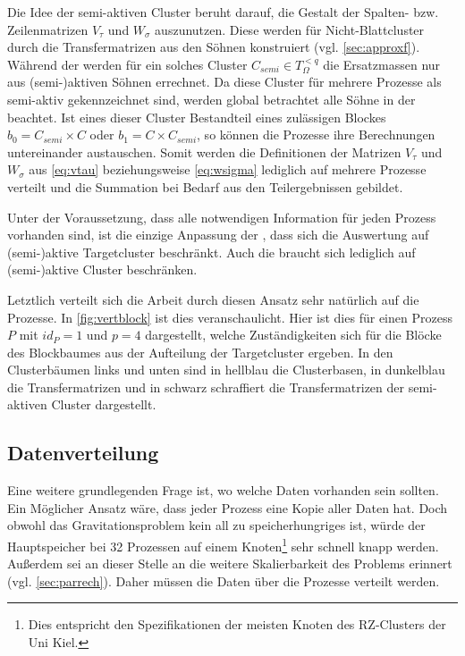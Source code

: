     Die Idee der semi-aktiven Cluster beruht darauf, die Gestalt der Spalten- bzw. Zeilenmatrizen $V_\tau$ und $W_\sigma$ auszunutzen. Diese werden für Nicht-Blattcluster durch die Transfermatrizen 
    aus den Söhnen konstruiert (vgl. \autoref{sec:approxf}). Während der \vorw werden für ein solches Cluster $C_{semi} \in T_\Omega^{<q}$ die Ersatzmassen nur aus (semi-)aktiven Söhnen
    errechnet. Da diese Cluster für mehrere Prozesse als semi-aktiv gekennzeichnet sind, werden global betrachtet alle Söhne in der \vorw beachtet. Ist eines dieser Cluster Bestandteil
    eines zulässigen Blockes $b_0 = C_{semi} \times C$ oder $b_1 = C \times C_{semi}$, so können die Prozesse ihre Berechnungen untereinander austauschen. Somit werden die Definitionen der Matrizen
    $V_\tau$ und $W_\sigma$ aus \autoref{eq:vtau} beziehungsweise \autoref{eq:wsigma} lediglich auf mehrere Prozesse verteilt und die Summation bei Bedarf aus den Teilergebnissen gebildet.
    
    Unter der Voraussetzung, dass alle notwendigen Information für jeden Prozess vorhanden sind, ist die einzige Anpassung der \koppl, dass sich die Auswertung auf (semi-)aktive
    Targetcluster beschränkt. Auch die \ruckw braucht sich lediglich auf (semi-)aktive Cluster beschränken.
    
    Letztlich verteilt sich die Arbeit durch diesen Ansatz sehr natürlich auf die Prozesse. In \autoref{fig:vertblock} ist dies veranschaulicht. Hier ist dies für einen Prozess $P$ mit $id_P = 1$ 
    und $p = 4$ dargestellt, welche Zuständigkeiten sich für die Blöcke des Blockbaumes aus der Aufteilung der Targetcluster ergeben. In den Clusterbäumen links und unten sind in hellblau die 
    Clusterbasen, in dunkelblau die Transfermatrizen und in schwarz schraffiert die Transfermatrizen der semi-aktiven Cluster dargestellt.
  
  \subsection{Datenverteilung}
  \label{sec:data}
    
    Eine weitere grundlegenden Frage ist, wo welche Daten vorhanden sein sollten. Ein Möglicher Ansatz wäre, dass jeder Prozess eine Kopie aller Daten hat. Doch obwohl das Gravitationsproblem kein all
    zu speicherhungriges ist, würde der Hauptspeicher bei 32 Prozessen auf einem Knoten\footnote{Dies entspricht den Spezifikationen der meisten Knoten des RZ-Clusters der Uni Kiel.}  sehr schnell 
    knapp werden. Außerdem sei an dieser Stelle an die weitere Skalierbarkeit des Problems erinnert (vgl. \autoref{sec:parrech}). Daher müssen die Daten über die Prozesse verteilt werden. 
    

